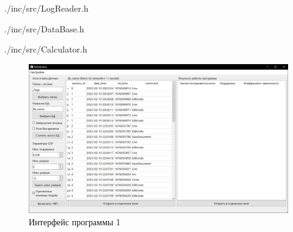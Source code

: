
%

\begin{lstinputlisting}[
	caption={Класс LogReader},
	label={LogReader.h},
	language=C++,
	]{./inc/src/LogReader.h}
\end{lstinputlisting}

\newpage
\begin{lstinputlisting}[
	caption={Класс DataBase},
	label={DataBase.h},
	language=C++,
	]{./inc/src/DataBase.h}
\end{lstinputlisting}

\newpage
\begin{lstinputlisting}[
	caption={Класс Calculator},
	label={Calculator.h},
	language=C++,
	]{./inc/src/Calculator.h}
\end{lstinputlisting}


\begin{figure}[h!]
	\centering
	\includegraphics[width=1\textwidth]{inc/img/interface1.jpg}
	\caption{Интерфейс программы 1}
	\label{interface1}
\end{figure}

